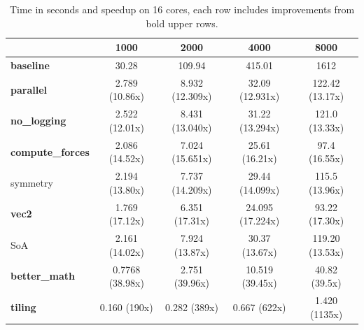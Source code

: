 \begin{table}[H]
    \centering
    \begin{tabular}{|l|c|c|c|c|}
        \hline
                                 & \textbf{1000}   & \textbf{2000}   & \textbf{4000}    & \textbf{8000}   \\
        \hline
        \textbf{baseline}        & 30.28           & 109.94          & 415.01           & 1612            \\

        \textbf{parallel}        & 2.789 (10.86x)  & 8.932 (12.309x) & 32.09 (12.931x)  & 122.42 (13.17x) \\

        \textbf{no\_logging}     & 2.522 (12.01x)  & 8.431 (13.040x) & 31.22 (13.294x)  & 121.0 (13.33x)  \\

        \textbf{compute\_forces} & 2.086 (14.52x)  & 7.024 (15.651x) & 25.61 (16.21x)   & 97.4 (16.55x)   \\

        symmetry                 & 2.194 (13.80x)  & 7.737 (14.209x) & 29.44 (14.099x)  & 115.5 (13.96x)  \\

        \textbf{vec2}            & 1.769 (17.12x)  & 6.351 (17.31x)  & 24.095 (17.224x) & 93.22 (17.30x)  \\

        SoA                      & 2.161 (14.02x)  & 7.924 (13.87x)  & 30.37 (13.67x)   & 119.20 (13.53x) \\

        \textbf{better\_math}    & 0.7768 (38.98x) & 2.751 (39.96x)  & 10.519 (39.45x)  & 40.82 (39.5x)   \\

        \textbf{tiling}          & 0.160 (190x)    & 0.282 (389x)    & 0.667 (622x)     & 1.420 (1135x)   \\

        \hline
    \end{tabular}
    \caption{Time in seconds and speedup on 16 cores, each row includes improvements from bold upper rows.}
    \label{tab:cpu-timings}
\end{table}
